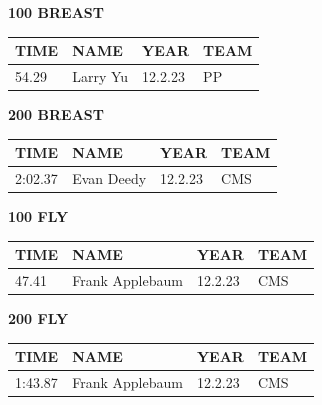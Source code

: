 \begin{table}[H]
\centering
\begin{minipage}[t]{0.48\textwidth}
\centering
\textbf{100 BREAST}\\[0.1cm]
\begin{tabular}{@{}p{1.8cm}p{2.8cm}p{1.2cm}p{1.4cm}@{}}
\hline
    \textbf{TIME} & \textbf{NAME} & \textbf{YEAR} & \textbf{TEAM} \\
\hline
    54.29 & Larry Yu & 12.2.23 & PP \\
\hline
\end{tabular}
\end{minipage}\hfill
\begin{minipage}[t]{0.48\textwidth}
\centering
\textbf{200 BREAST}\\[0.1cm]
\begin{tabular}{@{}p{1.8cm}p{2.8cm}p{1.2cm}p{1.4cm}@{}}
\hline
    \textbf{TIME} & \textbf{NAME} & \textbf{YEAR} & \textbf{TEAM} \\
\hline
    2:02.37 & Evan Deedy & 12.2.23 & CMS \\
\hline
\end{tabular}
\end{minipage}
\end{table}

\begin{table}[H]
\centering
\begin{minipage}[t]{0.48\textwidth}
\centering
\textbf{100 FLY}\\[0.1cm]
\begin{tabular}{@{}p{1.8cm}p{2.8cm}p{1.2cm}p{1.4cm}@{}}
\hline
    \textbf{TIME} & \textbf{NAME} & \textbf{YEAR} & \textbf{TEAM} \\
\hline
    47.41 & Frank Applebaum & 12.2.23 & CMS \\
\hline
\end{tabular}
\end{minipage}\hfill
\begin{minipage}[t]{0.48\textwidth}
\centering
\textbf{200 FLY}\\[0.1cm]
\begin{tabular}{@{}p{1.8cm}p{2.8cm}p{1.2cm}p{1.4cm}@{}}
\hline
    \textbf{TIME} & \textbf{NAME} & \textbf{YEAR} & \textbf{TEAM} \\
\hline
    1:43.87 & Frank Applebaum & 12.2.23 & CMS \\
\hline
\end{tabular}
\end{minipage}
\end{table}

